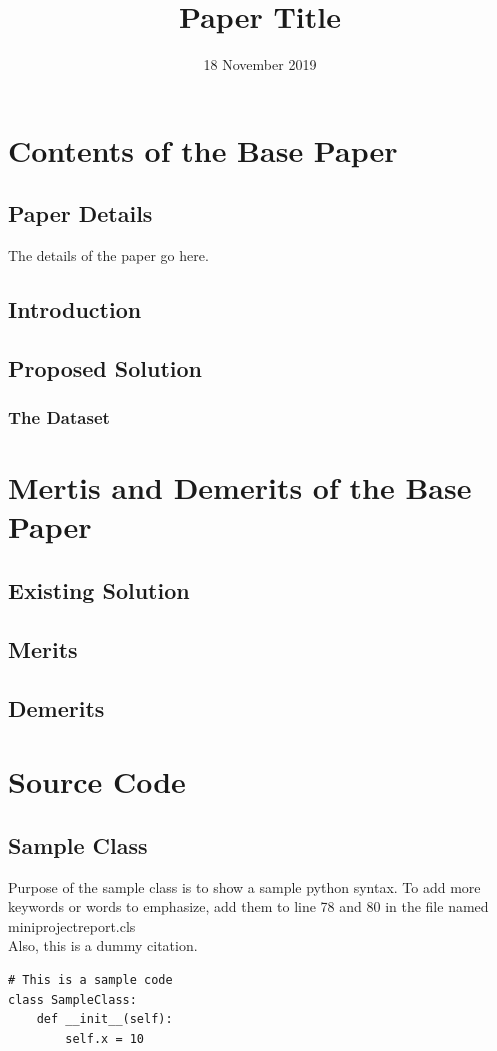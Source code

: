 \documentclass{miniprojectreport}
\title{Paper Title}
\date{18 November 2019}
\begin{document}
	\makeminireportfirstpage
	\bonafide
	\acknowledgement{\lipsum[1]}
	\newpage
	\tableofcontents
	\newpage
	\setcounter{page}{1}
	\chapter{Contents of the Base Paper}
		\setcounter{chapter}{1}
		\section{Paper Details}
		The details of the paper go here.
		\section{Introduction}
		\lipsum[3]
		\section{Proposed Solution}
		\lipsum[4]
		\subsection{The Dataset}
		\lipsum[5]
	\chapter{Mertis and Demerits of the Base Paper}
		\section{Existing Solution}
		\lipsum[6]
		\section{Merits}
		\lipsum[7]
		\section{Demerits}
		\lipsum[8]
	\chapter{Source Code}
	\section{Sample Class}
	Purpose of the sample class is to show a sample python syntax. To add more keywords or words to emphasize, add them to line 78 and 80 in the file named miniprojectreport.cls\\Also, this\cite{7457930} is a dummy citation.\\
\begin{lstlisting}
# This is a sample code
class SampleClass:
    def __init__(self):
        self.x = 10	
\end{lstlisting}
	
\end{document}
